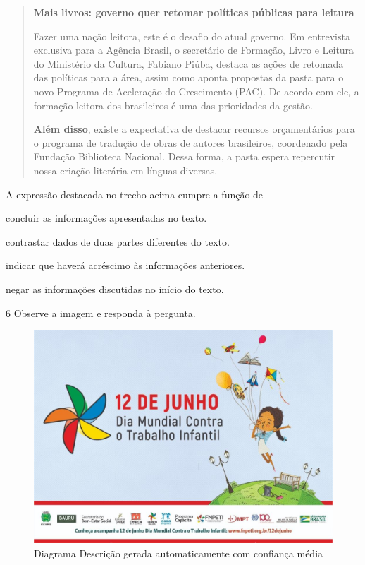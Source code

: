 \begin{quote}
\textbf{Mais livros: governo quer retomar políticas públicas para leitura}

Fazer uma nação leitora, este é o desafio do atual governo. Em
entrevista exclusiva para a Agência Brasil, o secretário de Formação,
Livro e Leitura do Ministério da Cultura, Fabiano Piúba, destaca as
ações de retomada das políticas para a área, assim como aponta propostas
da pasta para o novo Programa de Aceleração do Crescimento (PAC). De
acordo com ele, a formação leitora dos brasileiros é uma das prioridades
da gestão.

\textbf{Além disso}, existe a expectativa de destacar recursos orçamentários
para o programa de tradução de obras de autores brasileiros, coordenado
pela Fundação Biblioteca Nacional. Dessa forma, a pasta espera
repercutir nossa criação literária em línguas diversas.

\end{quote}

A expressão destacada no trecho acima cumpre a função de

\begin{escolha}
  \item concluir as informações apresentadas no texto.

  \item contrastar dados de duas partes diferentes do texto.

  \item indicar que haverá acréscimo às informações anteriores.

  \item negar as informações discutidas no início do texto.
\end{escolha}



\num{6} Observe a imagem e responda à pergunta.

\begin{figure}[htpb!]
\centering
\includegraphics[width=.5\textwidth]{./imgQ4PORT/media/image6.jpeg}
\caption{Diagrama Descrição gerada automaticamente com confiança média}
\end{figure}

